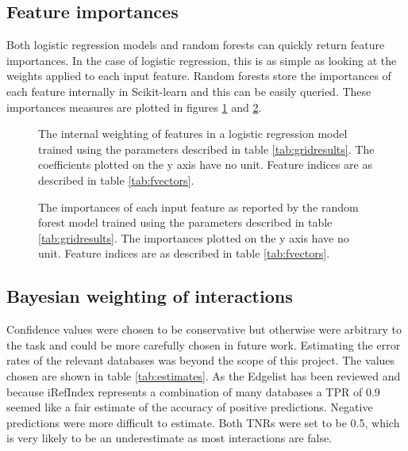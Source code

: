 \subsection{Feature importances}
\label{importances}

Both logistic regression models and random forests can quickly return feature importances.
In the case of logistic regression, this is as simple as looking at the weights applied to each input feature.
Random forests store the importances of each feature internally in Scikit-learn and this can be easily queried.
These importances measures are plotted in figures \ref{fig:logregweights} and \ref{fig:rfimportances}.

\begin{figure}
    \centering
    \setlength\figureheight{2in}
    \setlength\figurewidth{3in}
    \caption{The internal weighting of features in a logistic regression model trained using the parameters described in table \ref{tab:gridresults}. The coefficients plotted on the y axis have no unit. Feature indices are as described in table \ref{tab:fvectors}.}
    \label{fig:logregweights}
\end{figure}

\begin{figure}
    \centering
    \setlength\figureheight{2in}
    \setlength\figurewidth{3in}
    \caption{The importances of each input feature as reported by the random forest model trained using the parameters described in table \ref{tab:gridresults}. The importances plotted on the y axis have no unit. Feature indices are as described in table \ref{tab:fvectors}.}
    \label{fig:rfimportances}
\end{figure}

\subsection{Bayesian weighting of interactions}
\label{bayesresults}

Confidence values were chosen to be conservative but otherwise were arbitrary to the task and could be more carefully chosen in future work.
Estimating the error rates of the relevant databases was beyond the scope of this project.
The values chosen are shown in table \ref{tab:estimates}.
As the Edgelist has been reviewed and because iRefIndex represents a combination of many databases a \ac{TPR} of 0.9 seemed like a fair estimate of the accuracy of positive predictions.
Negative predictions were more difficult to estimate.
Both TNRs were set to be 0.5, which is very likely to be an underestimate as most interactions are false.

